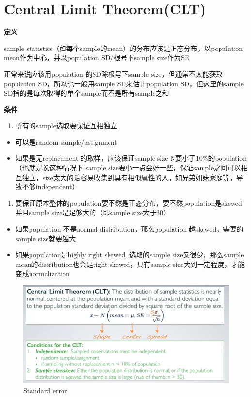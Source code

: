 \documentclass[]{book}
\providecommand{\tightlist}{%
  \setlength{\itemsep}{0pt}\setlength{\parskip}{0pt}}
\begin{document}
\section{Central Limit Theorem(CLT)}\label{central-limit-theoremclt}

\textbf{定义}

sample
statistics（如每个sample的mean）的分布应该是正态分布，以population
mean作为中心，并以population SD/根号下sample size作为SE

正常来说应该用population 的SD除根号下sample
size，但通常不太能获取population SD，所以也一般用sample
SD来估计population SD，但这里的sample
SD指的是每次取得的单个sample而不是所有sample之和

\textbf{条件}

\begin{enumerate}
\def\labelenumi{\arabic{enumi}.}
\tightlist
\item
  所有的sample选取要保证互相独立
\end{enumerate}

\begin{itemize}
\tightlist
\item
  可以是random sample/assignment
\item
  如果是无replacement 的取样，应该保证sample size
  N要小于10\%的population（也就是说这种情况下 sample
  size要小一点会好一些，保证sample之间可以相互独立，size太大的话容易收集到具有相似属性的人，如兄弟姐妹家庭等，导致不够independent）
\end{itemize}

\begin{enumerate}
\def\labelenumi{\arabic{enumi}.}
\setcounter{enumi}{1}
\tightlist
\item
  要保证原本整体的population要不然是正态分布，要不然population是skewed并且sample
  size是足够大的（即sample size大于30）
\end{enumerate}

\begin{itemize}
\tightlist
\item
  如果population 不是normal distribution，那么population
  越skewed，需要的sample size就要越大
\item
  如果population是highly right skewed, 选取的sample
  size又很少，那么sample mean的distribution也会是right
  skewed，只有sample size大到一定程度，才能变成normalization
\end{itemize}

\begin{figure}

{\centering \includegraphics[width=0.8\linewidth]{graphs/1-5} 

}

\caption{Standard error}\label{fig:fig5}
\end{figure}
\end{document}
